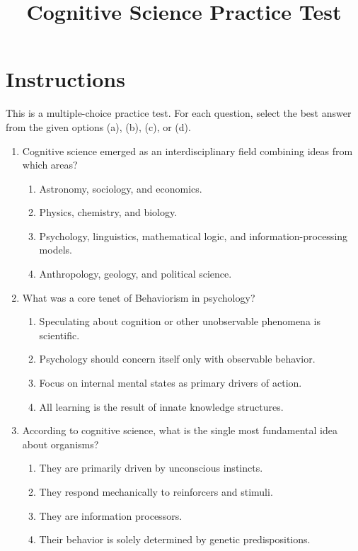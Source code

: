 \documentclass{article}
\begin{document}
\title{Cognitive Science Practice Test}
\author{}
\date{}
\maketitle

\section*{Instructions}
This is a multiple-choice practice test. For each question, select the best answer from the given options (a), (b), (c), or (d).

\begin{enumerate}[label=\arabic*.]

\item Cognitive science emerged as an interdisciplinary field combining ideas from which areas?
\begin{enumerate}[label=(\alph*)]
    \item Astronomy, sociology, and economics.
    \item Physics, chemistry, and biology.
    \item Psychology, linguistics, mathematical logic, and information-processing models.
    \item Anthropology, geology, and political science.
\end{enumerate}

\item What was a core tenet of Behaviorism in psychology?
\begin{enumerate}[label=(\alph*)]
    \item Speculating about cognition or other unobservable phenomena is scientific.
    \item Psychology should concern itself only with observable behavior.
    \item Focus on internal mental states as primary drivers of action.
    \item All learning is the result of innate knowledge structures.
\end{enumerate}

\item According to cognitive science, what is the single most fundamental idea about organisms?
\begin{enumerate}[label=(\alph*)]
    \item They are primarily driven by unconscious instincts.
    \item They respond mechanically to reinforcers and stimuli.
    \item They are information processors.
    \item Their behavior is solely determined by genetic predispositions.
\end{enumerate}


\end{enumerate}
\end{document}
